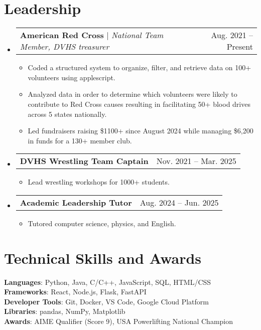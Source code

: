 \documentclass[letterpaper,11pt]{article}
\makeatletter
\newcommand{\resumeItem}[1]{
  \item\small{
    {#1 \vspace{-2pt}}
  }
}
\newcommand{\resumeProjectHeading}[2]{
    \item
    \begin{tabular*}{0.97\textwidth}{l@{\extracolsep{\fill}}r}
      \small#1 & #2 \\
    \end{tabular*}\vspace{-7pt}
}
\newcommand{\resumeSubHeadingListStart}{\begin{itemize}[leftmargin=0.15in, label={}]}
\newcommand{\resumeSubHeadingListEnd}{\end{itemize}}
\newcommand{\resumeItemListStart}{\begin{itemize}}
\newcommand{\resumeItemListEnd}{\end{itemize}\vspace{-5pt}}
\makeatother
\begin{document}
\section{Leadership}
    \resumeSubHeadingListStart
      \resumeProjectHeading
          {\textbf{American Red Cross} $|$ \emph{National Team Member, DVHS treasurer}}{Aug. 2021 -- Present}
          \resumeItemListStart
            \resumeItem{Coded a structured system to organize, filter, and retrieve data on 100+ volunteers using applescript.}
            \resumeItem{Analyzed data in order to determine which volunteers were likely to contribute to Red Cross causes resulting in facilitating 50+ blood drives across 5 states nationally.}
            \resumeItem{Led fundraisers raising \$1100+ since August 2024 while managing \$6,200 in funds for a 130+ member club.}
          \resumeItemListEnd
      \resumeProjectHeading
          {\textbf{DVHS Wrestling Team Captain}}{Nov. 2021 -- Mar. 2025}
          \resumeItemListStart
            \resumeItem{Lead wrestling workshops for 1000+ students.}
          \resumeItemListEnd
      \resumeProjectHeading
          {\textbf{Academic Leadership Tutor}}{Aug. 2024 -- Jun. 2025}
          \resumeItemListStart
            \resumeItem{Tutored computer science, physics, and English.}
          \resumeItemListEnd
    \resumeSubHeadingListEnd

\section{Technical Skills and Awards}
 \begin{itemize}[leftmargin=0.15in, label={}]
    \small{\item{
     \textbf{Languages}{: Python, Java, C/C++, JavaScript, SQL, HTML/CSS} \\
     \textbf{Frameworks}{: React, Node.js, Flask, FastAPI} \\
     \textbf{Developer Tools}{: Git, Docker, VS Code, Google Cloud Platform} \\
     \textbf{Libraries}{: pandas, NumPy, Matplotlib} \\
     \textbf{Awards}{: AIME Qualifier (Score 9), USA Powerlifting National Champion}
    }}
 \end{itemize}

\end{document}
